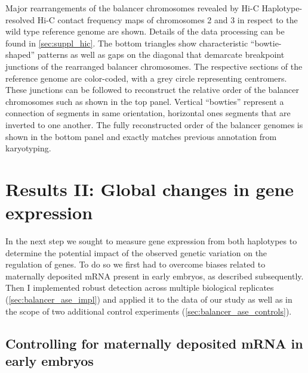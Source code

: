     {Major rearrangements of the balancer chromosomes revealed by Hi-C}{
     Haplotype-resolved Hi-C contact frequency maps of chromosomes 2 and 3 in
    respect to the wild type reference genome are shown. Details of the data
    processing can be found in \cref{sec:suppl_hic}. The bottom triangles show
    characteristic ``bowtie-shaped'' patterns as well as gaps on the diagonal
    that demarcate breakpoint junctions of the rearranged balancer chromosomes.
    The respective sections of the reference genome are color-coded, with a grey
    circle representing centromers.
     These junctions can be followed to reconstruct the relative order of the
    balancer chromosomes such as shown in the top panel. Vertical ``bowties''
    represent a connection of segments in same orientation, horizontal
    ones segments that are inverted to one another.
     The fully reconstructed order of the balancer genomes is shown in the bottom
    panel and exactly matches previous annotation from
    karyotyping.}
\FloatBarrier












\section{Results II: Global changes in gene expression}
\label{sec:balancer_ase}

In the next step we sought to measure gene expression from both haplotypes to
determine the potential impact of the observed genetic variation on the
regulation of genes. To do so we first had to overcome biases related to
maternally deposited mRNA present in early embryos, as described subsequently.
Then I implemented robust \ase detection across multiple biological replicates
(\cref{sec:balancer_ase_impl}) and applied it to the data of our study as well
as in the scope of two additional control experiments
(\cref{sec:balancer_ase_controls}).




\subsection{Controlling for maternally deposited mRNA in early embryos}
\label{sec:balancer_maternal_rna}

